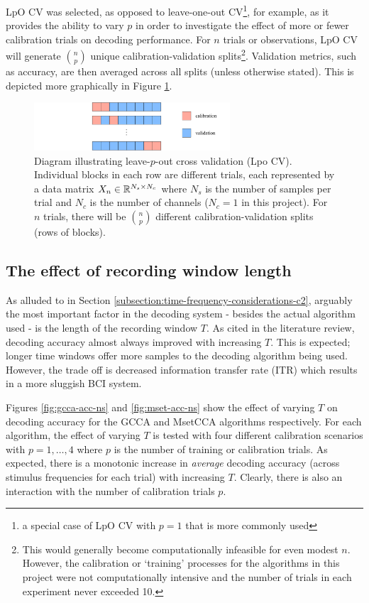 LpO CV was selected, as opposed to leave-one-out CV\footnote{a special case of LpO CV with $p=1$ that is more commonly used}, for example, as it provides the ability to vary $p$ in order to investigate the effect of more or fewer calibration trials on decoding performance. For $n$ trials or observations, LpO CV will generate $\binom{n}{p}$ unique calibration-validation splits\footnote{This would generally become computationally infeasible for even modest $n$. However, the calibration or `training' processes for the algorithms in this project were not computationally intensive and the number of trials in each experiment never exceeded 10.}. Validation metrics, such as accuracy, are then averaged across all splits (unless otherwise stated). This is depicted more graphically in Figure \ref{fig:lpocv-diagram}.
\begin{figure}[h]
    \centering
    \includegraphics[width=0.65\textwidth]{LpoCV}
    \caption[Leave-$p$-out cross validation (Lpo CV)]{Diagram illustrating leave-$p$-out cross validation (Lpo CV). Individual blocks in each row are different trials, each represented by a data matrix $X_n\in\mathbb{R}^{N_s\times N_c}$ where $N_s$ is the number of samples per trial and $N_c$ is the number of channels ($N_c=1$ in this project). For $n$ trials, there will be $\binom{n}{p}$ different calibration-validation splits (rows of blocks).}
    \label{fig:lpocv-diagram}
\end{figure}

\subsection{The effect of recording window length}
\label{subsection:decoding-acc-ns-effect}
As alluded to in Section \ref{subsection:time-frequency-considerations-c2}, arguably the most important factor in the decoding system - besides the actual algorithm used - is the length of the recording window $T$. As cited in the literature review, decoding accuracy almost always improved with increasing $T$. This is expected; longer time windows offer more samples to the decoding algorithm being used. However, the trade off is decreased information transfer rate (ITR) which results in a more sluggish BCI system. 

Figures \ref{fig:gcca-acc-ns} and \ref{fig:mset-acc-ns} show the effect of varying $T$ on decoding accuracy for the GCCA and MsetCCA algorithms respectively. For each algorithm, the effect of varying $T$ is tested with four different calibration scenarios with $p=1,\dots,4$ where $p$ is the number of training or calibration trials. As expected, there is a monotonic increase in \textit{average} decoding accuracy (across stimulus frequencies for each trial) with increasing $T$. Clearly, there is also an interaction with the number of calibration trials $p$.

